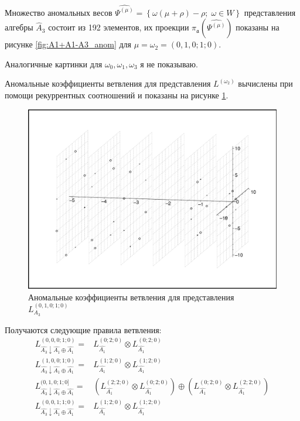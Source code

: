 \documentclass[a4paper,12pt]{article}
\theoremstyle{definition} \newtheorem{Def}{Definition}
\begin{document}
Множество аномальных весов  $\widehat{\Psi^{(\mu)}}=\left\{\omega(\mu+\rho)-\rho;\; \omega\in
  W\right\}$ представления алгебры $\hat{A}_3$ состоит из 192 элементов, их проекции
$\pi_{\mathfrak{a}}\left(\widehat{\Psi^{(\mu)}}\right)$ показаны на рисунке  \ref{fig:A1+A1-A3_anom}
для $\mu=\omega_2=(0,1,0;1;0)$.

Аналогичные картинки для $\omega_0, \omega_1,\omega_3$ я не показываю.

Аномальные коэффициенты ветвления для представления  $L^{(\omega_2)}$ вычислены при помощи
рекуррентных соотношений и показаны на рисунке \ref{fig:A1+A1-A3_branching}. 
\begin{figure}[h!tb]
  \hspace*{-2cm}\includegraphics[width=180mm]{A1+A1-A3_branching.pdf}
  \caption{Аномальные коэффициенты ветвления для представления $L^{(0,1,0;1;0)}_{A_3}$}
  \label{fig:A1+A1-A3_branching}
\end{figure}

Получаются следующие правила ветвления:
 \begin{equation}
   \label{eq:39}
   \begin{array}{ll}
     L^{(0,0,0;1;0)}_{\hat{A_3}\downarrow \hat{A_1}\oplus \hat{A_1}}= & L_{\hat{A_1}}^{(0;2;0)}\otimes L_{\hat{A_1}}^{(0;2;0)} \\
     L^{(1,0,0;1;0)}_{\hat{A_3}\downarrow \hat{A_1}\oplus \hat{A_1}}= & L_{\hat{A_1}}^{(1;2;0)}\otimes L_{\hat{A_1}}^{(1;2;0)} \\
     L^{(0,1,0;1;0]}_{\hat{A_3}\downarrow \hat{A_1}\oplus \hat{A_1}}= & \left( L_{\hat{A_1}}^{(2;2;0)}\otimes L_{\hat{A_1}}^{(0;2;0)}\right) \oplus \left( L_{\hat{A_1}}^{(0;2;0)}\otimes L_{\hat{A_1}}^{(2;2;0)}\right) \\
     L^{(0,0,1;1;0)}_{\hat{A_3}\downarrow \hat{A_1}\oplus \hat{A_1}}= & L_{\hat{A_1}}^{(1;2;0)}\otimes L_{\hat{A_1}}^{(1;2;0)} \\     
   \end{array}
 \end{equation}
\end{document}
